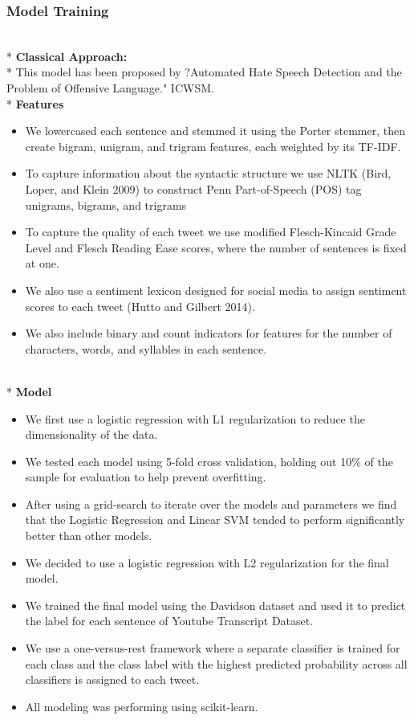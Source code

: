 \documentclass{article}[A4]
\begin{document}
\subsubsection{Model Training}
\\*
\textbf{Classical Approach:}\\*
This model has been proposed by ?Automated Hate Speech Detection and the Problem of Offensive Language." ICWSM.
\\*
\textbf{Features} 

\begin{itemize}
	\item{We lowercased each sentence and stemmed it using the Porter stemmer, then create bigram, unigram, and trigram features, each weighted by its TF-IDF.}
	\item{To capture information about the syntactic structure we use NLTK (Bird, Loper, and Klein 2009) to construct Penn Part-of-Speech (POS) tag unigrams, bigrams, and trigrams}
	\item{To capture the quality of each tweet we use modified Flesch-Kincaid Grade Level and Flesch Reading Ease scores, where the number of sentences is fixed at one.}
	\item{We also use a sentiment lexicon designed for social media to assign sentiment scores to each tweet (Hutto and Gilbert 2014).}
	\item{We also include binary and count indicators for features for the number of characters, words, and syllables in each sentence.}
\end{itemize}
\\*
\textbf{Model} 
\begin{itemize}
\item{We first use a logistic regression with L1 regularization to reduce the dimensionality of the data.}
\item{We tested each model using 5-fold cross validation, holding out 10\% of the sample for evaluation to help prevent overfitting.}
\item{After using a grid-search to iterate over the models and parameters we find that the Logistic Regression and Linear SVM tended to perform significantly better than other models.}
\item{We decided to use a logistic regression with L2 regularization for the final model.}
\item{We trained the final model using the Davidson dataset and used it to predict the label for each sentence of Youtube Transcript Dataset.}
\item{We use a one-versus-rest framework where a separate classifier is trained for each class and the class label with the highest predicted probability across all classifiers is assigned to each tweet.}
\item{All modeling was performing using scikit-learn.}
\end{itemize}
\end{document}
